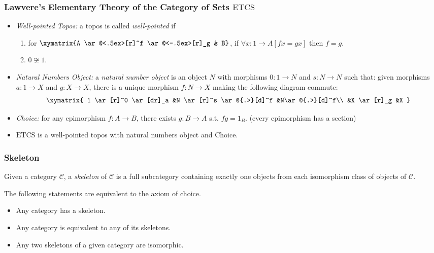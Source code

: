 \documentclass[UTF8,aspectratio=43,11pt,colorlinks,compress,openany]{beamer}%
\begin{document}
\begin{frame}\frametitle{Lawvere's Elementary Theory of the Category of Sets $\mathrm{ETCS}$}
\setlength\abovedisplayskip{0pt}
\setlength\belowdisplayskip{0pt}
\begin{itemize}
	\item \emph{Well-pointed Topos:} a topos is called \emph{well-pointed} if
	\begin{enumerate}
		\item for $\xymatrix{A \ar@<.5ex>[r]^f \ar@<-.5ex>[r]_g & B}$, if $\forall x: 1\to A[fx=gx]$ then $f=g$.
		\item $0\not\cong 1$.
	\end{enumerate}
	\item \emph{Natural Numbers Object:} a \emph{natural number object} is an object $N$ with morphisms $0: 1\to N$ and $s: N \to N$ such that: given morphisms $a: 1\to X$ and $g: X \to X$, there is a unique morphism $f: N \to X$ making the following diagram commute:
\[
\xymatrix{
1 \ar[r]^0 \ar[dr]_a &N \ar[r]^s \ar@{.>}[d]^f &N\ar@{.>}[d]^f\\
 &X \ar[r]_g &X
}
\]
	\item \emph{Choice:} for any epimorphism $f: A\to B$, there exists $g: B\to A$ s.t. $fg=1_B$. (every epimorphism has a section)
	\item $\mathrm{ETCS}$ is a well-pointed topos with natural numbers object and Choice.
\end{itemize}
\end{frame}

\begin{frame}\frametitle{Skeleton}
\begin{definition}[Skeleton]
	Given a category $\mathcal{C}$, a \emph{skeleton} of $\mathcal{C}$ is a full subcategory containing exactly one objects from each isomorphism class of objects of $\mathcal{C}$.
\end{definition}
\begin{block}{The following statements are equivalent to the axiom of choice.}
\begin{itemize}
	\item Any category has a skeleton.
	\item Any category is equivalent to any of its skeletons.
	\item Any two skeletons of a given category are isomorphic.
\end{itemize}	
\end{block}
\end{frame}
\end{document}
